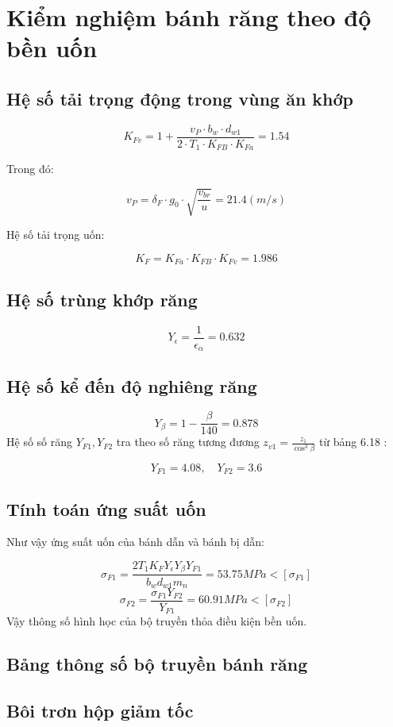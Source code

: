\section{Kiểm nghiệm bánh răng theo độ bền uốn}

\subsection{Hệ số tải trọng động trong vùng ăn khớp}

\[
K_{Fv} = 1 + \frac{v_P \cdot b_w \cdot d_{w1}}{2 \cdot T_1 \cdot K_{FB} \cdot K_{Fa}} = 1.54
\]

Trong đó:

\[
v_P = \delta_F \cdot g_0 \cdot \sqrt{\frac{v_{br}}{u}} = 21.4(m/s)
\]

Hệ số tải trọng uốn:

\[
K_F = K_{Fa} \cdot K_{FB} \cdot K_{Fv} = 1.986
\]

\subsection{Hệ số trùng khớp răng}

\[
Y_\epsilon = \frac{1}{\epsilon_\alpha} = 0.632
\]

\subsection{Hệ số kể đến độ nghiêng răng}

\[
Y_\beta = 1 - \frac{\beta}{140} = 0.878
\]
Hệ số số răng $Y_{F1}, Y_{F2}$ tra theo số răng tương đương $z_{v1} = \frac{z_1}{\cos^3 \beta}$ từ bảng 6.18 \cite{reference}:

\[
Y_{F1} = 4.08, \quad Y_{F2} = 3.6
\]

\subsection{Tính toán ứng suất uốn}

Như vậy ứng suất uốn của bánh dẫn và bánh bị dẫn:

\[
\sigma_{F1} = \frac{2T_1 K_F Y_\epsilon Y_\beta Y_{F1}}{b_w d_{w1} m_n} = 53.75 MPa < [\sigma_{F1}]
\]
\[
\sigma_{F2} = \frac{\sigma_{F1} Y_{F2}}{Y_{F1}} = 60.91 MPa < [\sigma_{F2}]
\]
Vậy thông số hình học của bộ truyền thỏa điều kiện bền uốn.
\subsection{Bảng thông số bộ truyền bánh răng}
\subsection{Bôi trơn hộp giảm tốc}
\cleardoublepage